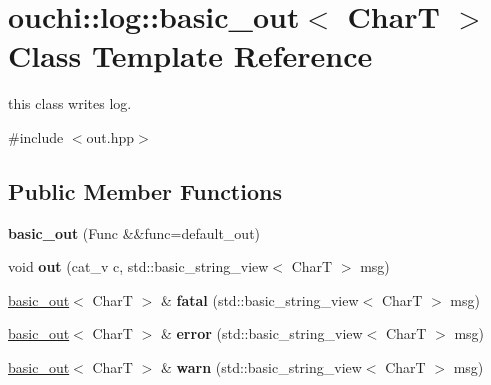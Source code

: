 \hypertarget{classouchi_1_1log_1_1basic__out}{}\section{ouchi\+::log\+::basic\+\_\+out$<$ CharT $>$ Class Template Reference}
\label{classouchi_1_1log_1_1basic__out}


this class writes log.  




{\ttfamily \#include $<$out.\+hpp$>$}

\subsection*{Public Member Functions}
\begin{DoxyCompactItemize}
\item 
\mbox{\label{classouchi_1_1log_1_1basic__out_ad19f237b539b645db74f185484524632}} 
{\bfseries basic\+\_\+out} (Func \&\&func=default\+\_\+out)
\item 
\mbox{\label{classouchi_1_1log_1_1basic__out_af99bccb07511cfb9e89ad2fb966e754f}} 
void {\bfseries out} (cat\+\_\+v c, std\+::basic\+\_\+string\+\_\+view$<$ CharT $>$ msg)
\item 
\mbox{\label{classouchi_1_1log_1_1basic__out_ad1d94a6256de2e34884822b336f056d6}} 
\mbox{\hyperlink{classouchi_1_1log_1_1basic__out}{basic\+\_\+out}}$<$ CharT $>$ \& {\bfseries fatal} (std\+::basic\+\_\+string\+\_\+view$<$ CharT $>$ msg)
\item 
\mbox{\label{classouchi_1_1log_1_1basic__out_a39f084688640bce9e132729419fc6148}} 
\mbox{\hyperlink{classouchi_1_1log_1_1basic__out}{basic\+\_\+out}}$<$ CharT $>$ \& {\bfseries error} (std\+::basic\+\_\+string\+\_\+view$<$ CharT $>$ msg)
\item 
\mbox{\label{classouchi_1_1log_1_1basic__out_afb190b55472bde0a4602598b8e69d009}} 
\mbox{\hyperlink{classouchi_1_1log_1_1basic__out}{basic\+\_\+out}}$<$ CharT $>$ \& {\bfseries warn} (std\+::basic\+\_\+string\+\_\+view$<$ CharT $>$ msg)
\item 

\end{DoxyCompactItemize}
